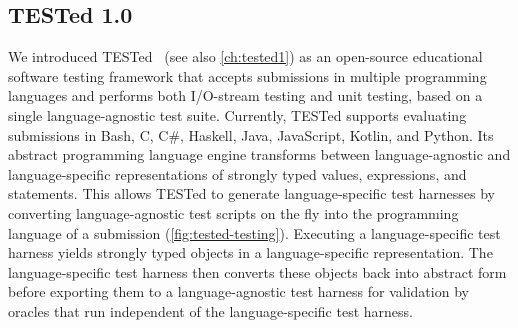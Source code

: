 \documentclass[../main]{subfiles}
\begin{document}
\subsection{TESTed 1.0}\label{subsec:tested-1.0}

We introduced TESTed~\autocite{strijbolTESTedEducationalTesting2023} (see also \vref{ch:tested1}) as an open-source educational software testing framework that accepts submissions in multiple programming languages and performs both I/O-stream testing and unit testing, based on a single language-agnostic test suite.
Currently, TESTed supports evaluating submissions in Bash, C, C\#, Haskell, Java, JavaScript, Kotlin, and Python.
Its abstract programming language engine transforms between language-agnostic and language-specific representations of strongly typed values, expressions, and statements.
This allows TESTed to generate language-specific test harnesses by converting language-agnostic test scripts on the fly into the programming language of a submission (\vref{fig:tested-testing}).
Executing a language-specific test harness yields strongly typed objects in a language-specific representation.
The language-specific test harness then converts these objects back into abstract form before exporting them to a language-agnostic test harness for validation by oracles that run independent of the language-specific test harness.
\end{document}

